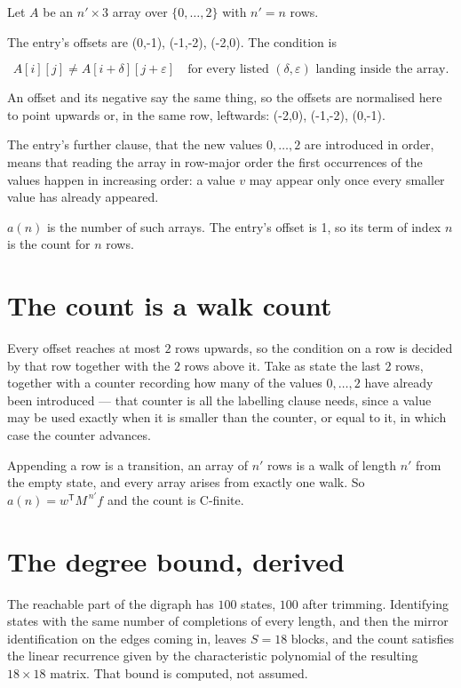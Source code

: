 \documentclass[11pt]{article}
\theoremstyle{definition}
\begin{document}
Let $A$ be an $n' \times 3$ array over $\{0,\dots,2\}$ with $n' = n$ rows.

The entry's offsets are (0,-1), (-1,-2), (-2,0). The condition is

\[A[i][j] \ne A[i{+}\delta][j{+}\varepsilon]\quad\text{for every listed }(\delta,\varepsilon)\text{ landing inside the array.}\]

An offset and its negative say the same thing, so the offsets are normalised here to point upwards or, in the same row, leftwards: (-2,0), (-1,-2), (0,-1).

The entry's further clause, that the new values $0,\dots,2$ are introduced in order, means that reading the array in row-major order the first occurrences of the values happen in increasing order: a value $v$ may appear only once every smaller value has already appeared.

$a(n)$ is the number of such arrays. The entry's offset is 1, so its term of index $n$ is the count for $n$ rows.

\section{The count is a walk count}

Every offset reaches at most $2$ rows upwards, so the condition on a row is decided by that row together with the $2$ rows above it. Take as state the last $2$ rows, together with a counter recording how many of the values $0,\dots,2$ have already been introduced --- that counter is all the labelling clause needs, since a value may be used exactly when it is smaller than the counter, or equal to it, in which case the counter advances.

Appending a row is a transition, an array of $n'$ rows is a walk of length $n'$ from the empty state, and every array arises from exactly one walk. So $a(n) = w^{\mathsf T}M^{\,n'}f$ and the count is C-finite.

\section{The degree bound, derived}

The reachable part of the digraph has $100$ states, $100$ after trimming. Identifying states with the same number of completions of every length, and then the mirror identification on the edges coming in, leaves $S = 18$ blocks, and the count satisfies the linear recurrence given by the characteristic polynomial of the resulting $18\times18$ matrix. That bound is computed, not assumed.
\end{document}
